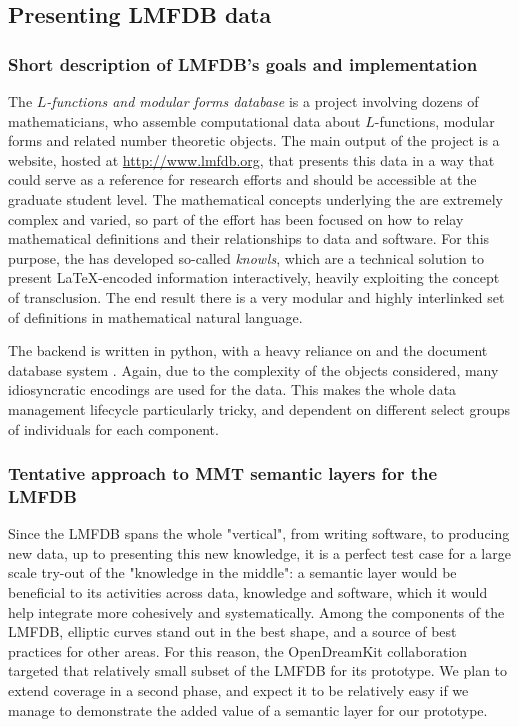 \subsection{Presenting LMFDB data}
\subsubsection{Short description of LMFDB's goals and implementation}
The \emph{$L$-functions and modular forms database} is a project involving dozens of  mathematicians, who assemble computational data about $L$-functions, modular  forms and related number theoretic objects. The main output of the project is a website, hosted at \url{http://www.lmfdb.org}, that presents this data in a way that could serve as a reference for research efforts and should be accessible at the graduate student level.  The mathematical concepts underlying the \LMFDB are extremely complex and varied, so part of the effort has been focused on how to relay mathematical definitions and their relationships to data and software. For this purpose, the \LMFDB has developed so-called \emph{knowls}, which are a technical solution to present \LaTeX-encoded information interactively, heavily exploiting the concept of transclusion. The end result there is a very modular and highly interlinked set of definitions in mathematical natural language. 
 
The \LMFDB backend is written in \textsf{python}, with a heavy reliance on \Sage and the document database system \Mongo \cite{lmfdb-repo}. Again, due to the complexity of the objects considered, many idiosyncratic encodings are used for the data. This makes the whole data management lifecycle particularly tricky, and dependent on different select groups of individuals for each component. 

\subsubsection{Tentative approach to MMT semantic layers for the LMFDB}
Since the LMFDB spans the whole "vertical", from writing software, to producing new data, up to presenting this new knowledge,  it is a perfect test case for a large scale try-out of the "knowledge in the middle": a semantic layer would be beneficial to its activities across data, knowledge and software, which it would help integrate more cohesively and systematically. Among the components of the LMFDB, elliptic curves stand out in the best shape, and a source of best practices for other areas. For this reason, the OpenDreamKit collaboration targeted that relatively small subset of the LMFDB for its prototype. We plan to extend coverage in a second phase, and expect it to be relatively easy if we manage to demonstrate the added value of a semantic layer for our prototype. 

